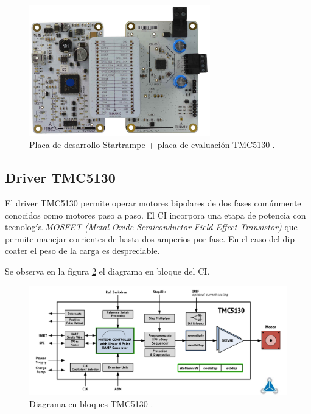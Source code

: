 \begin{figure}[htpb]
\centering 
\includegraphics[width=0.7\textwidth]{./Figures/tmc5130_placa_v2.jpg}
\caption{Placa de desarrollo Startrampe + placa de evaluación TMC5130 \protect\footnotemark.}
\label{fig:tmc5130_placa}
\end{figure}



  
\subsection{Driver TMC5130}
\label{subsection:Driver TMC5130}
El driver TMC5130 permite operar motores bipolares de dos fases comúnmente conocidos como motores paso a paso. El CI incorpora una etapa de potencia con tecnología \textit{MOSFET (Metal Oxide Semiconductor Field Effect Transistor)}  que permite manejar corrientes de hasta dos amperios por fase. En el caso del dip coater el peso de la carga es despreciable.

Se observa en la figura \ref{fig:tmc5130_diagrama} el diagrama en bloque del CI.

\begin{figure}[htpb]
\centering 
\includegraphics[width=1.1\textwidth]{./Figures/tmc5130_diagrama.png}
\caption{Diagrama en bloques TMC5130 \protect\footnotemark.}
\label{fig:tmc5130_diagrama}
\end{figure}

